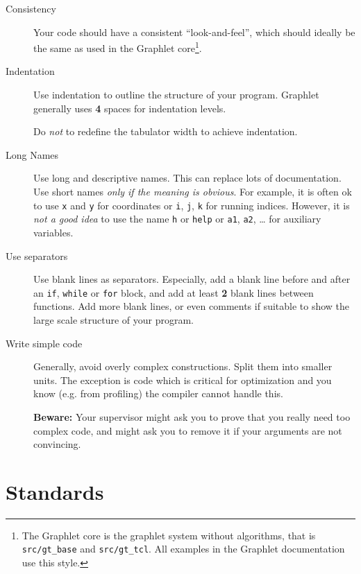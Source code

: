 \begin{description}
  
  \item[Consistency] Your code should have a consistent
  ``look-and-feel'', which should ideally be the same as used in
  the Graphlet core\footnote{The Graphlet core is the graphlet
    system without algorithms, that is \texttt{src/gt\_base} and
    \texttt{src/gt\_tcl}. All examples in the Graphlet
    documentation use this style.}.
  
  \item[Indentation] Use indentation to outline the structure of
  your program. Graphlet generally uses \textbf{4} spaces for
  indentation levels.
  \begin{note}
    Do \emph{not} to redefine the tabulator width to achieve
    indentation.
  \end{note}
  
  \item[Long Names] Use long and descriptive names.  This can
  replace lots of documentation.  Use short names \emph{only if
    the meaning is obvious}.  For example, it is often ok to use
  \texttt{x} and \texttt{y} for coordinates or \texttt{i},
  \texttt{j}, \texttt{k} for running indices.  However, it is
  \emph{not a good idea} to use the name \texttt{h} or
  \texttt{help} or \texttt{a1}, \texttt{a2}, \ldots{} for
  auxiliary variables.
  
  \item[Use separators] Use blank lines as separators.
  Especially, add a blank line before and after an \texttt{if},
  \texttt{while} or \texttt{for} block, and add at least
  \textbf{2} blank lines between functions.  Add more blank
  lines, or even comments if suitable to show the large scale
  structure of your program.

  \item[Write simple code] Generally, avoid overly complex 
  constructions.  Split them into smaller units.  The exception is 
  code which is critical for optimization and you know (e.g.  from 
  profiling) the compiler cannot handle this.
  
  \textbf{Beware:} Your supervisor might ask you to prove that you 
  really need too complex code, and might ask you to remove it if your 
  arguments are not convincing.

\end{description}


%
%

\section{Standards}

